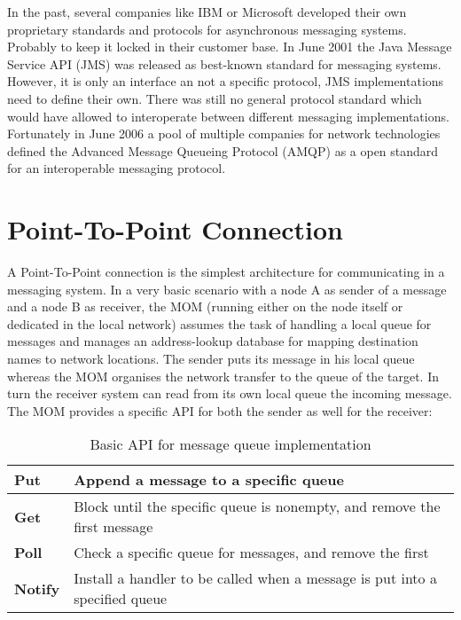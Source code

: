 In the past, several companies like IBM or Microsoft developed their own
proprietary standards and protocols for asynchronous messaging systems.
Probably to keep it locked in their customer base. In June 2001 the Java Message
Service API (JMS) was released as best-known standard for messaging systems.
However, it is only an interface an not a specific protocol, JMS implementations
need to define their own. There was still no general protocol standard which
would have allowed to interoperate between different messaging implementations.
Fortunately in June 2006 a pool of multiple companies for network technologies
defined the Advanced Message Queueing Protocol (AMQP) as a open standard for an
interoperable messaging protocol. \cite{PrpAMQP}
 

\section{Point-To-Point Connection}
\label{intro-messaging-pointtopoint}
A Point-To-Point connection is the simplest architecture for communicating in a
messaging system. In a very basic scenario with a node A as sender of a message
and a node B as receiver, the MOM (running either on the node itself or
dedicated in the local network) assumes the task of handling a local queue for messages and manages an address-lookup
database for mapping destination names to network locations. The sender puts its
message in his local queue whereas the MOM organises the network transfer to the
queue of the target. In turn the receiver system can read from its own
local queue the incoming message. The MOM provides a specific API for both the
sender as well for the receiver:
\begin{table}[H]
\centering
\begin{tabular}{|l|l|}
\hline
\textbf{Put}    & Append a message to a specific queue                                        \\ \hline
\textbf{Get}    & Block until the specific queue is nonempty, and remove the first message    \\ \hline
\textbf{Poll}   & Check a specific queue for messages, and remove the first                   \\ \hline
\textbf{Notify} & Install a handler to be called when a message is put into a specified queue \\ \hline
\end{tabular}
\caption{Basic API for message queue implementation \cite{TAN06}}
\end{table}

